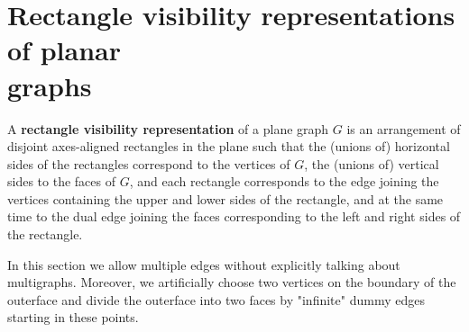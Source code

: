 \section{Rectangle visibility representations of planar \\ graphs}

\begin{defn}
	A \textbf{rectangle visibility representation} of a plane graph $G$ is an arrangement of disjoint axes-aligned rectangles in the plane such that the (unions of) horizontal sides of the rectangles correspond to the vertices of $G$, the (unions of) vertical sides to the faces of $G$, and each rectangle corresponds to the edge joining the vertices containing the upper and lower sides of the rectangle, and at the same time to the dual edge joining the faces corresponding to the left and right sides of the rectangle.
\end{defn}

\begin{comm}
	In this section we allow multiple edges without explicitly talking about \\ multigraphs. Moreover, we artificially choose two vertices on the boundary of the outerface and divide the outerface into two faces by "infinite" dummy edges starting in these points.
\end{comm}

